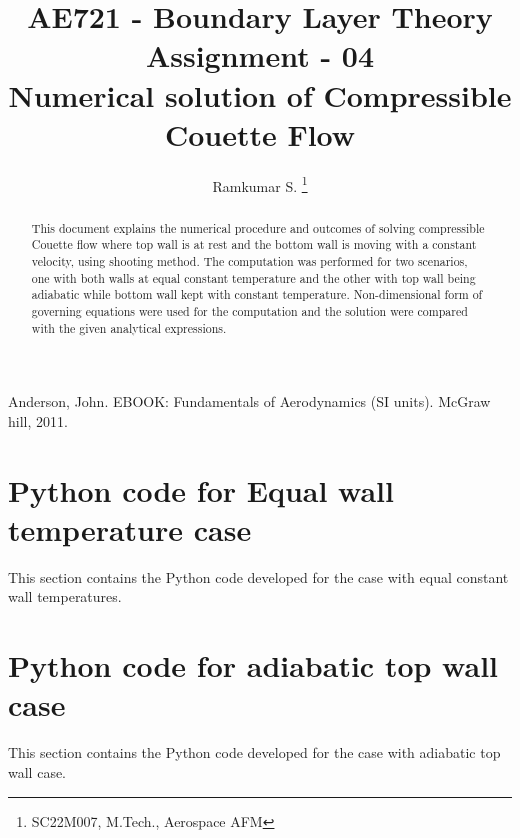 \documentclass[conf]{new-aiaa}
\title{AE721 - Boundary Layer Theory \\ Assignment - 04\\ Numerical solution of Compressible Couette Flow}
\author{Ramkumar S. \footnote{SC22M007, M.Tech., Aerospace AFM }}
\affil{SC22M007, M.Tech. Aerospace - Aerodynamics and Flight Mechanics}
\begin{document}
\maketitle

\begin{abstract}
    This document explains the numerical procedure and outcomes of solving
    compressible Couette flow where top wall is at rest and the bottom
    wall is moving with a constant velocity, using shooting method. The
    computation was performed for two scenarios, one with both walls at
    equal constant temperature and the other with top wall being adiabatic
    while bottom wall kept with constant temperature. Non-dimensional form
    of governing equations were used for the computation and the solution were
    compared with the given analytical expressions.
\end{abstract}




\begin{thebibliography}{2}
      Anderson, John. EBOOK: Fundamentals of Aerodynamics (SI units). McGraw hill, 2011.
\end{thebibliography}

\pagebreak

\begin{appendices}

    \section{Python code for Equal wall temperature case}\label{ewt_code}
    This section contains the Python code developed for the case with equal
    constant wall temperatures.
    

    \section{Python code for adiabatic top wall case}\label{aw_code}
    This section contains the Python code developed for the case with
    adiabatic top wall case.
    

\end{appendices}

\par
\center{**********}
\end{document}
